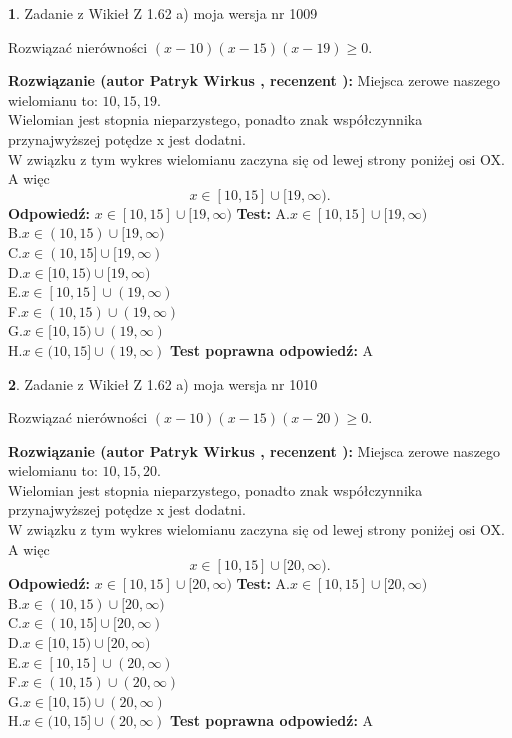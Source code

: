 \documentclass[12pt, a4paper]{article}
\theoremstyle{definition} %
\newtheorem{zad}{}
\newcommand{\zadStart}[1]{\begin{zad}#1\newline}
\newcommand{\zadStop}{\end{zad}}
\newcommand{\rozwStart}[2]{\noindent \textbf{Rozwiązanie (autor #1 , recenzent #2): }\newline}
\newcommand{\rozwStop}{\newline}
\newcommand{\odpStart}{\noindent \textbf{Odpowiedź:}\newline}
\newcommand{\odpStop}{\newline}
\newcommand{\testStart}{\noindent \textbf{Test:}\newline}
\newcommand{\testStop}{\newline}
\newcommand{\kluczStart}{\noindent \textbf{Test poprawna odpowiedź:}\newline}
\newcommand{\kluczStop}{\newline}
\begin{document}
\zadStart{Zadanie z Wikieł Z 1.62 a) moja wersja nr 1009}

Rozwiązać nierówności $(x-10)(x-15)(x-19)\ge0$.
\zadStop
\rozwStart{Patryk Wirkus}{}
Miejsca zerowe naszego wielomianu to: $10, 15, 19$.\\
Wielomian jest stopnia nieparzystego, ponadto znak współczynnika przy\linebreak najwyższej potędze x jest dodatni.\\ W związku z tym wykres wielomianu zaczyna się od lewej strony poniżej osi OX. A więc $$x \in [10,15] \cup [19,\infty).$$
\rozwStop
\odpStart
$x \in [10,15] \cup [19,\infty)$
\odpStop
\testStart
A.$x \in [10,15] \cup [19,\infty)$\\
B.$x \in (10,15) \cup [19,\infty)$\\
C.$x \in (10,15] \cup [19,\infty)$\\
D.$x \in [10,15) \cup [19,\infty)$\\
E.$x \in [10,15] \cup (19,\infty)$\\
F.$x \in (10,15) \cup (19,\infty)$\\
G.$x \in [10,15) \cup (19,\infty)$\\
H.$x \in (10,15] \cup (19,\infty)$
\testStop
\kluczStart
A
\kluczStop



\zadStart{Zadanie z Wikieł Z 1.62 a) moja wersja nr 1010}

Rozwiązać nierówności $(x-10)(x-15)(x-20)\ge0$.
\zadStop
\rozwStart{Patryk Wirkus}{}
Miejsca zerowe naszego wielomianu to: $10, 15, 20$.\\
Wielomian jest stopnia nieparzystego, ponadto znak współczynnika przy\linebreak najwyższej potędze x jest dodatni.\\ W związku z tym wykres wielomianu zaczyna się od lewej strony poniżej osi OX. A więc $$x \in [10,15] \cup [20,\infty).$$
\rozwStop
\odpStart
$x \in [10,15] \cup [20,\infty)$
\odpStop
\testStart
A.$x \in [10,15] \cup [20,\infty)$\\
B.$x \in (10,15) \cup [20,\infty)$\\
C.$x \in (10,15] \cup [20,\infty)$\\
D.$x \in [10,15) \cup [20,\infty)$\\
E.$x \in [10,15] \cup (20,\infty)$\\
F.$x \in (10,15) \cup (20,\infty)$\\
G.$x \in [10,15) \cup (20,\infty)$\\
H.$x \in (10,15] \cup (20,\infty)$
\testStop
\kluczStart
A
\kluczStop
\end{document}
